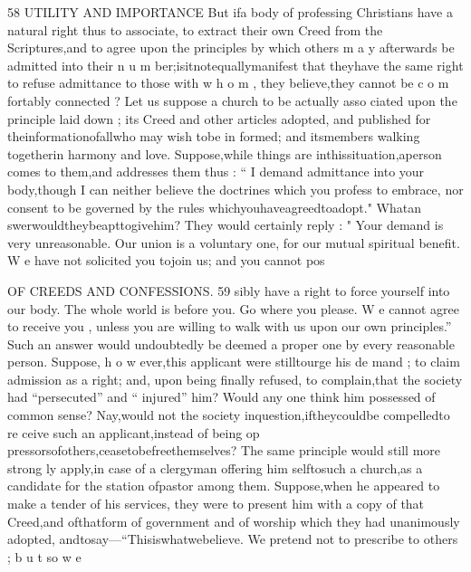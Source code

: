 \documentclass[
]{book}
\begin{document}
58 UTILITY AND IMPORTANCE
But ifa body of professing Christians have
a natural right thus to associate, to extract
their own Creed from the Scriptures,and to agree upon the principles by which others
m a y afterwards be admitted into their n u m ber;isitnotequallymanifest that theyhave the same right to refuse admittance to those with w h o m , they believe,they cannot be c o m fortably connected ?
Let us suppose a church to be actually asso ciated upon the principle laid down ; its Creed and other articles adopted, and published for theinformationofallwho may wish tobe in formed; and itsmembers walking togetherin harmony and love. Suppose,while things are inthissituation,aperson comes to them,and
addresses them thus : `` I demand admittance
into your body,though I can neither believe
the doctrines which you profess to embrace,
nor consent to be governed by the rules
whichyouhaveagreedtoadopt." Whatan
swerwouldtheybeapttogivehim? They
would certainly reply : " Your demand is very unreasonable. Our union is a voluntary one,
for our mutual spiritual benefit. W e have not solicited you tojoin us; and you cannot pos

OF CREEDS AND CONFESSIONS. 59
sibly have a right to force yourself into our
body. The whole world is before you. Go
where you please. W e cannot agree to receive
you , unless you are willing to walk with us
upon our own principles.'' Such an answer
would undoubtedly be deemed a proper one
by every reasonable person. Suppose, h o w
ever,this applicant were stilltourge his de
mand ; to claim admission as a right; and,
upon being finally refused, to complain,that
the society had ``persecuted'' and `` injured''
him? Would any one think him possessed of
common sense? Nay,would not the society
inquestion,iftheycouldbe compelledto re
ceive such an applicant,instead of being op pressorsofothers,ceasetobefreethemselves?
The same principle would still more strong
ly apply,in case of a clergyman offering him
selftosuch a church,as a candidate for the
station ofpastor among them. Suppose,when
he appeared to make a tender of his services,
they were to present him with a copy of that
Creed,and ofthatform of government and of
worship which they had unanimously adopted, andtosay---``Thisiswhatwebelieve. We
pretend not to prescribe to others ; b u t so w e
\end{document}
